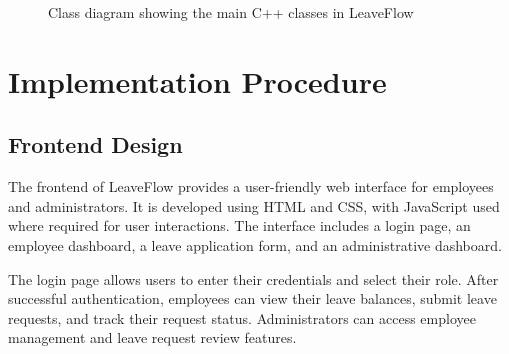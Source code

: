 \documentclass[12pt,a4paper,oneside]{book}
\begin{document}
\begin{figure}[htbp]

\caption{Class diagram showing the main C++ classes in LeaveFlow}

\label{fig:class-diagram}

\end{figure}



\section{Implementation Procedure}



\subsection{Frontend Design}



The frontend of LeaveFlow provides a user-friendly web interface for employees and administrators. It is developed using HTML and CSS, with JavaScript used where required for user interactions. The interface includes a login page, an employee dashboard, a leave application form, and an administrative dashboard.



The login page allows users to enter their credentials and select their role. After successful authentication, employees can view their leave balances, submit leave requests, and track their request status. Administrators can access employee management and leave request review features.
\end{document}
